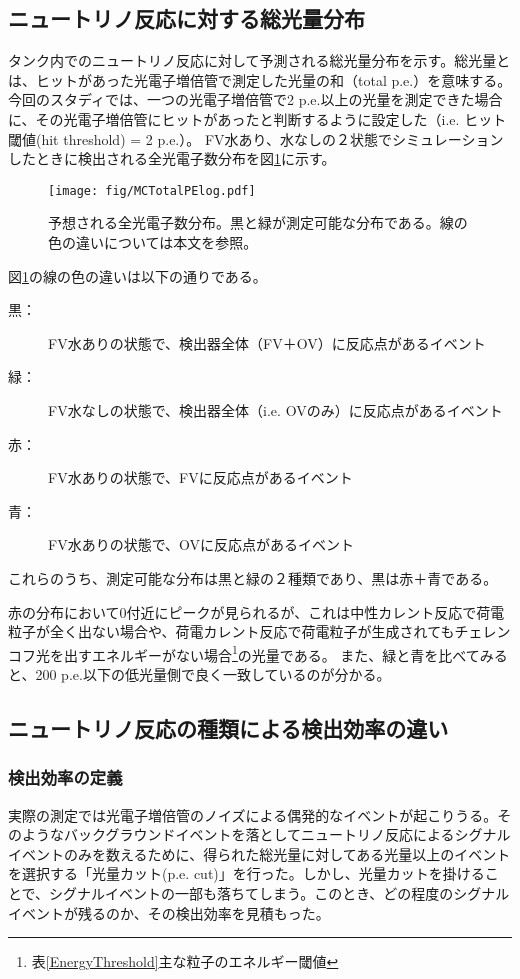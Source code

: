 \documentclass[11pt]{ltjsreport}
\newcommand{\figref}[1]{図\ref{#1}}
\newcommand{\tabref}[1]{表\ref{#1}}
\begin{document}
\subsection{ニュートリノ反応に対する総光量分布}
タンク内でのニュートリノ反応に対して予測される総光量分布を示す。総光量とは、ヒットがあった光電子増倍管で測定した光量の和（total p.e.）を意味する。今回のスタディでは、一つの光電子増倍管で2 p.e.以上の光量を測定できた場合に、その光電子増倍管にヒットがあったと判断するように設定した（i.e. ヒット閾値(hit threshold) = 2 p.e.）。
FV水あり、水なしの２状態でシミュレーションしたときに検出される全光電子数分布を\figref{MCTotalPElog}に示す。

\begin{figure}[htbp]
\centering
\texttt{[image: fig/MCTotalPElog.pdf]}
\caption[予想される全光電子数分布]{予想される全光電子数分布。黒と緑が測定可能な分布である。線の色の違いについては本文を参照。}
\label{MCTotalPElog}
\end{figure}


\figref{MCTotalPElog}の線の色の違いは以下の通りである。

\begin{description}
\item [黒：] FV水ありの状態で、検出器全体（FV＋OV）に反応点があるイベント
\item [緑：] FV水なしの状態で、検出器全体（i.e. OVのみ）に反応点があるイベント
\item [赤：]  FV水ありの状態で、FVに反応点があるイベント
\item [青：]  FV水ありの状態で、OVに反応点があるイベント
\end{description}

これらのうち、測定可能な分布は黒と緑の２種類であり、黒は赤＋青である。

赤の分布において0付近にピークが見られるが、これは中性カレント反応で荷電粒子が全く出ない場合や、荷電カレント反応で荷電粒子が生成されてもチェレンコフ光を出すエネルギーがない場合\footnote{\tabref{EnergyThreshold}主な粒子のエネルギー閾値}の光量である。
また、緑と青を比べてみると、200 p.e.以下の低光量側で良く一致しているのが分かる。

\subsection{ニュートリノ反応の種類による検出効率の違い}
\subsubsection{検出効率の定義}
実際の測定では光電子増倍管のノイズによる偶発的なイベントが起こりうる。そのようなバックグラウンドイベントを落としてニュートリノ反応によるシグナルイベントのみを数えるために、得られた総光量に対してある光量以上のイベントを選択する「光量カット(p.e. cut)」を行った。しかし、光量カットを掛けることで、シグナルイベントの一部も落ちてしまう。このとき、どの程度のシグナルイベントが残るのか、その検出効率を見積もった。
\end{document}
